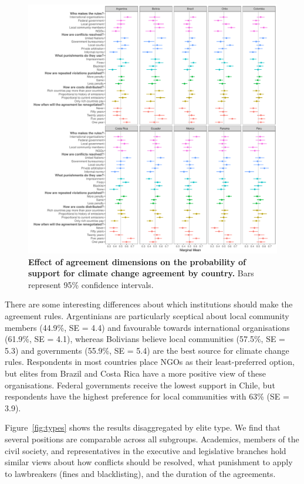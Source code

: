 \documentclass[a4paper,12pt]{article}
\begin{document}
\begin{figure}[H]
	\centering
	\includegraphics[width=\linewidth]{countries.pdf}
	\caption{\textbf{Effect of agreement dimensions on the probability of support for climate change agreement by country.} Bars represent 95\% confidence intervals.}
	\label{fig:countries}
\end{figure}

There are some interesting differences about which institutions should make the agreement rules. Argentinians are particularly sceptical about local community members (44.9\%, SE = 4.4) and favourable towards international organisations (61.9\%, SE = 4.1), whereas Bolivians believe local communities (57.5\%, SE = 5.3) and governments (55.9\%, SE = 5.4) are the best source for climate change rules. Respondents in most countries place NGOs as their least-preferred option, but elites from Brazil and Costa Rica have a more positive view of these organisations. Federal governments receive the lowest support in Chile, but respondents have the highest preference for local communities with 63\% (SE = 3.9). 

Figure~\ref{fig:types} shows the results disaggregated by elite type. We find that several positions are comparable across all subgroups. Academics, members of the civil society, and representatives in the executive and legislative branches hold similar views about how conflicts should be resolved, what punishment to apply to lawbreakers (fines and blacklisting), and the duration of the agreements.
\end{document}

